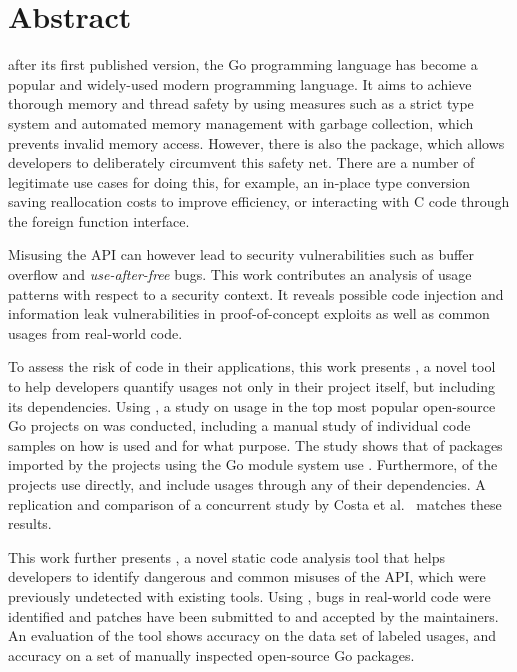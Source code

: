\chapter*{Abstract}

 after its first published version, the Go programming language has become a popular and
widely-used modern programming language.
It aims to achieve thorough memory and thread safety by using measures such as a strict type system and automated memory
management with garbage collection, which prevents invalid memory access.
However, there is also the \unsafe{} package, which allows developers to deliberately circumvent this safety net.
There are a number of legitimate use cases for doing this, for example, an in-place type conversion saving reallocation
costs to improve efficiency, or interacting with C code through the foreign function interface.

Misusing the \unsafe{} API can however lead to security vulnerabilities such as buffer overflow and
\textit{use-after-free} bugs.
This work contributes an analysis of \unsafe{} usage patterns with respect to a security context.
It reveals possible code injection and information leak vulnerabilities in proof-of-concept exploits as well as common
usages from real-world code.

To assess the risk of \unsafe{} code in their applications, this work presents \toolGeiger{}, a novel tool to help
developers quantify \unsafe{} usages not only in their project itself, but including its dependencies.
Using \toolGeiger{}, a study on \unsafe{} usage in the top \projsTotal{} most popular open-source Go projects on
\github{} was conducted, including a manual study of \numberLabeledCodeSnippets{} individual code samples on how
\unsafe{} is used and for what purpose.
The study shows that \percentageUnsafePackages{} of packages imported by the projects using the Go module system use
\unsafe{}.
Furthermore, \percentageUnsafeProjects{} of the projects use \unsafe{} directly, and
\percentageUnsafeTransitiveWithDependencies{} include \unsafe{} usages through any of their dependencies.
A replication and comparison of a concurrent study by Costa et al.~\cite{costa2020} matches these results.

This work further presents \toolSafer{}, a novel static code analysis tool that helps developers to identify
 dangerous and common misuses of the \unsafe{} API, which were previously undetected with existing tools.
Using \toolSafer{}, \numberBugsFixed{} bugs in real-world code were identified and patches have been submitted to and
accepted by the maintainers.
An evaluation of the tool shows \goSaferEvaluationDatasetGosaferAccuracy{} accuracy on the data set of labeled \unsafe{}
usages, and \goSaferEvaluationPackagesGosaferAccuracy{} accuracy on a set of manually inspected open-source Go packages.


